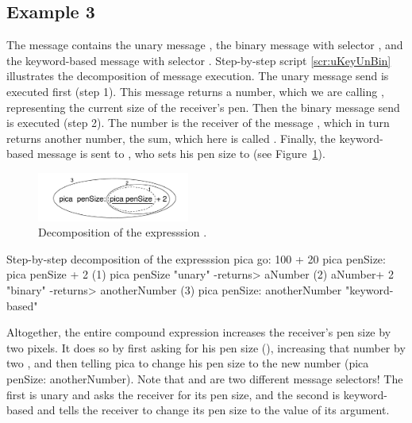 \documentclass[a4paper,10pt,twoside]{book}
\begin{document}
\subsection{Example 3}
The message  contains the unary message , the 
binary message with selector \ct{+}, and the keyword-based message with selector . 
Step-by-step script \ref{scr:uKeyUnBin} illustrates the decomposition of message execution. The unary message send 
 is executed first (step 1). This message returns a number, which we are calling 
, representing the current size of the receiver’s pen. Then the binary message send 
 is executed (step 2). The number  is the receiver of the message , 
which in turn returns another number, the sum, which here is called . Finally, 
the keyword-based message  is sent to , who sets his pen size to 
 (see Figure~\ref{fig:uKeyUnBin}). 

\begin{figure}[h]
	\centerline{\includegraphics[width=5cm]{uKeyUnBin}}
	\caption{Decomposition of the expresssion . 
	\label{fig:uKeyUnBin}}
\end{figure}

\begin{script}[uKeyUnBin]{Step-by-step decomposition of the expresssion pica go: 100 + 20}
pica penSize: pica penSize + 2 
(1)               pica penSize        "unary" 
-returns> aNumber  
(2)               aNumber+ 2         "binary" 
-returns> anotherNumber 
(3) pica penSize: anotherNumber "keyword-based" 
\end{script}


Altogether, the entire compound expression increases the receiver’s pen size by two 
pixels. It does so by first asking  for his pen size (), increasing that number 
by two , and then telling pica to change his pen size to the new number 
(pica penSize: anotherNumber). Note that  and  are two different message 
selectors! The first is unary and asks the receiver for its pen size, and the second is keyword- 
based and tells the receiver to change its pen size to the value of its argument. 
\end{document}
